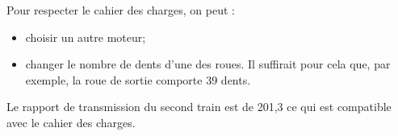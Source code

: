 Pour respecter le cahier des charges, on peut :
\begin{itemize}
\item choisir un autre moteur;
\item changer le nombre de dents d'une des roues. Il suffirait pour cela que,  par exemple, la roue de sortie comporte 39 dents. 
\end{itemize}
\else
\fi

\ifprof
Le rapport de transmission du second train est de 201,3 ce qui est compatible avec le cahier des charges.
\else
\fi


\ifprof
\else


\fi

